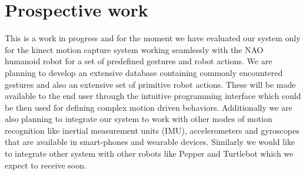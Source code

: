 \documentclass{llncs}
\begin{document}
\section{Prospective work}
	This is a work in progress and for the moment we have evaluated our system only for the kinect motion capture system working seamlessly with the NAO humanoid robot for a set of predefined gestures and robot actions. We are planning to develop an extensive database containing commonly encountered gestures and also an extensive set of primitive robot actions. These will be made available to the end user through the intuitive programming interface which could be then used for defining complex motion driven behaviors. Additionally we are also planning to integrate our system to work with other modes of motion recognition like inertial measurement units (IMU), accelerometers and gyroscopes that are available in smart-phones and wearable devices. Similarly we would like to integrate other system with other robots like Pepper and Turtlebot which we expect to receive soon.
\end{document}
